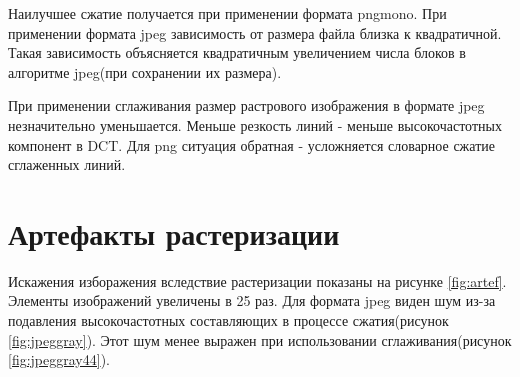 \documentclass[11pt]{article}
\begin{document}
Наилучшее сжатие получается при применении формата pngmono. При применении формата jpeg зависимость от размера файла близка к  квадратичной. Такая зависимость объясняется квадратичным увеличением числа блоков в алгоритме jpeg(при сохранении их размера).

При применении сглаживания размер растрового изображения в формате jpeg незначительно уменьшается. Меньше резкость линий - меньше высокочастотных компонент в DCT. Для png ситуация обратная - усложняется словарное сжатие сглаженных линий.

\section*{Артефакты растеризации}
Искажения изборажения вследствие растеризации показаны на рисунке \ref{fig:artef}. Элементы изображений увеличены в 25 раз. Для формата jpeg виден шум из-за подавления высокочастотных составляющих в процессе сжатия(рисунок \ref{fig:jpeggray}). Этот шум менее выражен при использовании сглаживания(рисунок \ref{fig:jpeggray44}).
\end{document}
